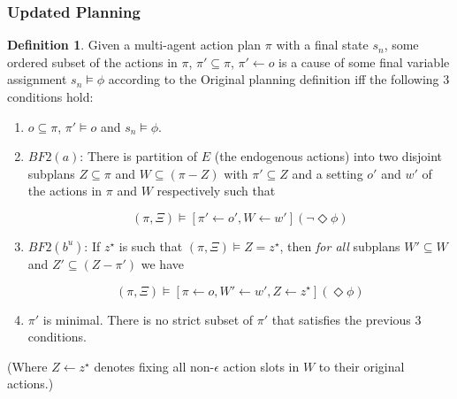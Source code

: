 \documentclass{article}
\theoremstyle{plain}
\theoremstyle{definition}
\newtheorem{defn}[thm]{Definition} %
\begin{document}
\subsubsection*{Updated Planning}
\begin{defn}
Given a multi-agent action plan $\pi$ with a final state $s_n$, some ordered subset of the actions in $\pi$, $\pi' \subseteq \pi$, $\pi' \leftarrow o$ is a cause of some final variable assignment $s_n \models \phi$ according to the Original planning definition iff the following 3 conditions hold:
\begin{enumerate}
\item  $o \subseteq \pi$, $\pi' \models o$ and $s_n \models \phi$.



\item $BF2(a)$: There is partition of $E$ (the endogenous actions) into two disjoint subplans $Z \subseteq \pi$ and $W \subseteq (\pi - Z)$ with $\pi' \subseteq Z$ and a setting $o'$ and $w'$ of the actions in $\pi$ and $W$ respectively such that

\[
(\pi, \Xi) \models [\pi' \leftarrow o', W \leftarrow w'](\lnot \Diamond \phi)
\]

\item $BF2(b^u)$: If $z^\star$ is such that $(\pi, \Xi) \models Z = z^\star$, then \textit{for all} subplans $W' \subseteq W$ and $Z' \subseteq (Z - \pi')$ we have

\[
(\pi, \Xi) \models [\pi \leftarrow o, W' \leftarrow w', Z \leftarrow z^\star](\Diamond \phi)
\]

\item $\pi'$ is minimal. There is no strict subset of $\pi'$ that satisfies the previous 3 conditions.
\end{enumerate}
\end{defn}

(Where $Z\leftarrow z^\star$ denotes fixing all non-$\epsilon$ action slots in $W$ to their original actions.)
\end{document}
